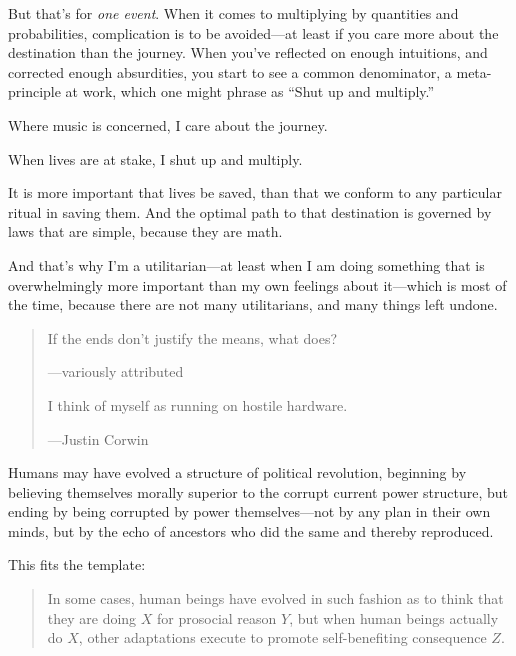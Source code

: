  But that's for \textit{one event}. When it comes
to multiplying by quantities and probabilities, complication is to be
avoided---at least if you care more about the destination than the
journey. When you've reflected on enough intuitions,
and corrected enough absurdities, you start to see a common
denominator, a meta-principle at work, which one might phrase as
``Shut up and multiply.''


 Where music is concerned, I care about the journey.


 When lives are at stake, I shut up and multiply.


 It is more important that lives be saved, than that we conform to
any particular ritual in saving them. And the optimal path to that
destination is governed by laws that are simple, because they are
math.


 And that's why I'm a
utilitarian---at least when I am doing something that is overwhelmingly
more important than my own feelings about it---which is most of the
time, because there are not many utilitarians, and many things left
undone.

\myendsectiontext


\bigskip


\begin{quote}

 If the ends don't justify the means, what does?

{\raggedleft
 {}---variously attributed
\par}




 I think of myself as running on hostile hardware.

{\raggedleft
 {}---Justin Corwin
\par}
\end{quote}




 Humans may have evolved a structure of political revolution,
beginning by believing themselves morally superior to the corrupt
current power structure, but ending by being corrupted by power
themselves{}---not by any plan in their own minds, but by the echo of
ancestors who did the same and thereby reproduced.


 This fits the template:

\begin{quote}
{
 In some cases, human beings have evolved in such fashion as to
think that they are doing $X$ for prosocial reason $Y$, but when human
beings actually do $X$, other adaptations execute to promote
self-benefiting consequence $Z$.}
\end{quote}


